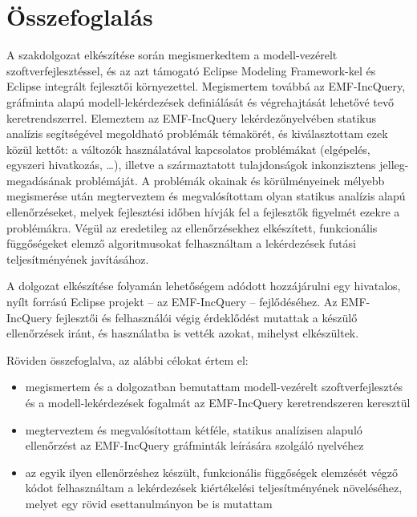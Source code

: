 \chapter{Összefoglalás}
\label{chap:summary}

A szakdolgozat elkészítése során megismerkedtem a modell-vezérelt szoftverfejlesztéssel, és az azt támogató Eclipse Modeling Framework-kel és Eclipse integrált fejlesztői környezettel.
Megismertem továbbá az EMF-IncQuery, gráfminta alapú modell-lekérdezések definiálását és végrehajtását lehetővé tevő keretrendszerrel.
Elemeztem az EMF-IncQuery lekérdezőnyelvében statikus analízis segítségével megoldható problémák témakörét, és kiválasztottam ezek közül kettőt: a változók használatával kapcsolatos problémákat (elgépelés, egyszeri hivatkozás, \ldots), illetve a származtatott tulajdonságok inkonzisztens jelleg-megadásának problémáját.
A problémák okainak és körülményeinek mélyebb megismerése után megterveztem és megvalósítottam olyan statikus analízis alapú ellenőrzéseket, melyek fejlesztési időben hívják fel a fejlesztők figyelmét ezekre a problémákra.
Végül az eredetileg az ellenőrzésekhez elkészített, funkcionális függőségeket elemző algoritmusokat felhasználtam a lekérdezések futási teljesítményének javításához.

A dolgozat elkészítése folyamán lehetőségem adódott hozzájárulni egy hivatalos, nyílt forrású Eclipse projekt -- az EMF-IncQuery -- fejlődéséhez.
Az EMF-IncQuery fejlesztői és felhasználói végig érdeklődést mutattak a készülő ellenőrzések iránt, és használatba is vették azokat, mihelyst elkészültek.

Röviden összefoglalva, az alábbi célokat értem el:
\begin{itemize}
    \item megismertem és a dolgozatban bemutattam modell-vezérelt szoftverfejlesztés és a modell-lekérdezések fogalmát az EMF-IncQuery keretrendszeren keresztül 
    \item megterveztem és megvalósítottam kétféle, statikus analízisen alapuló ellenőrzést az EMF-IncQuery gráfminták leírására szolgáló nyelvéhez
    \item az egyik ilyen ellenőrzéshez készült, funkcionális függőségek elemzését végző kódot felhasználtam a lekérdezések kiértékelési teljesítményének növeléséhez, melyet egy rövid esettanulmányon be is mutattam
\end{itemize}

